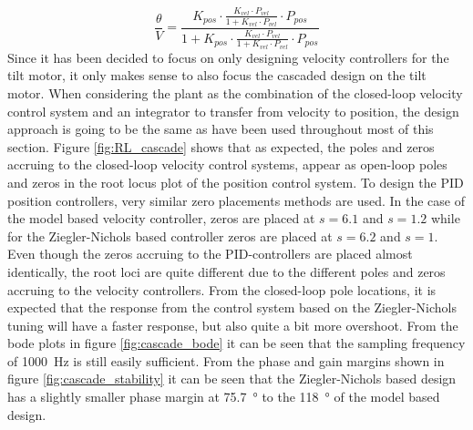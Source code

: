 \documentclass[../../main.tex]{subfiles}
\begin{document}
\begin{equation} \label{eq:tf_cascaded_design}
    \frac{\theta}{V}=\frac{K_{pos}\cdot\frac{K_{vel}\cdot P_{vel}}{1+K_{vel}\cdot P_{vel}}\cdot P_{pos}}{1+ K_{pos}\cdot\frac{K_{vel}\cdot P_{vel}}{1+K_{vel}\cdot P_{vel}}\cdot P_{pos}}
\end{equation}
Since it has been decided to focus on only designing velocity controllers for the tilt motor, it only makes sense to also focus the cascaded design on the tilt motor.
When considering the plant as the combination of the closed-loop velocity control system and an integrator to transfer from velocity to position, the design approach is going to be the same as have been used throughout most of this section. 
Figure \ref{fig:RL_cascade} shows that as expected, the poles and zeros accruing to the closed-loop velocity control systems, appear as open-loop poles and zeros in the root locus plot of the position control system. To design the PID position controllers, very similar zero placements methods  are used. In the case of the model based velocity controller, zeros are placed at $s = 6.1$ and $s = 1.2$ while for the Ziegler-Nichols based controller zeros are placed at $s = 6.2$ and $s = 1$. Even though the zeros accruing to the PID-controllers are placed almost identically, the root loci are quite different due to the different poles and zeros accruing to the velocity controllers. From the closed-loop pole locations, it is expected that the response from the control system based on the Ziegler-Nichols tuning will have a faster response, but also quite a bit more overshoot. From the bode plots in figure \ref{fig:cascade_bode} it can be seen that the sampling frequency of \SI{1000}{\hertz} is still easily sufficient. From the phase and gain margins shown in figure \ref{fig:cascade_stability} it can be seen that the Ziegler-Nichols based design has a slightly smaller phase margin at \SI{75.7}{\degree} to the \SI{118}{\degree} of the model based design.
\end{document}
